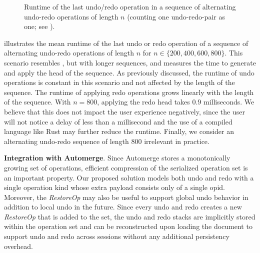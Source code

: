 \documentclass[sigplan,natbib=false,review]{acmart}
\newcommand{\restopkind}{\textit{RestoreOp}}
\begin{document}
\begin{figure}
\caption{
  Runtime of the last undo/redo operation
  in a sequence of alternating undo-redo operations of length $n$
  (counting one undo-redo-pair as one; see ).
}\label{fig:runtime-undo-redo-alt}
\end{figure}

 illustrates the mean runtime of the last
undo or redo operation of a sequence of alternating undo-redo operations
of length $n$ for $n \in \{200, 400, 600, 800\}$.
This scenario resembles , but with longer sequences,
and measures the time to generate and apply the head of the sequence.
As previously discussed, the runtime of undo operations is constant in this
scenario and not affected by the length of the sequence.
The runtime of applying redo operations grows linearly with the length of the sequence.
With $n = 800$, applying the redo head takes 0.9 milliseconds.
We believe that this does not impact the user experience negatively,
since the user will not notice a delay of less than a millisecond and the use
of a compiled language like Rust may further reduce the runtime.
Finally, we consider an alternating undo-redo sequence of length 800 irrelevant
in practice.

\textbf{Integration with Automerge}.
Since Automerge stores a monotonically growing set of operations,
efficient compression of the serialized operation set is an important property.
Our proposed solution models both undo and redo with a single
operation kind whose extra payload consists only of a single \gls*{opid}.
Moreover, the \restopkind{} may also be useful to support global undo
behavior in addition to local undo in the future.
Since every undo and redo creates a new \restopkind{} that is added
to the set,
the undo and redo stacks are implicitly stored within the operation set and
can be reconstructed upon loading the document to support undo and redo
across sessions without any additional persistency overhead.
\end{document}
